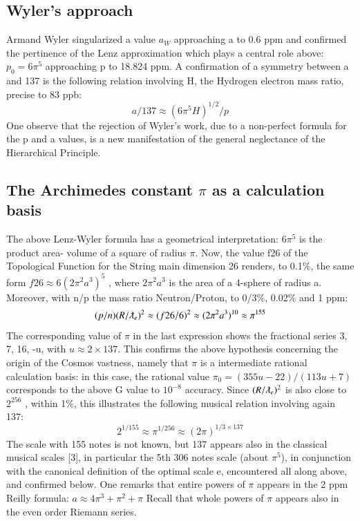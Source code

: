 \documentclass[twoside,draft]{article}
\begin{document}
{\subsection {Wyler's approach}

Armand Wyler singularized a value $a_{W}$ approaching a to 0.6 ppm and confirmed the pertinence
of the Lenz approximation which plays a central role above: $p_{0} = 6\pi^{5}$ approaching p to 18.824 ppm.
A confirmation of a symmetry between a and 137 is the following relation involving H, the
Hydrogen electron mass ratio, precise to 83 ppb:
$$a/137 \approx (6\pi^{5} H)^{1/2} /p$$
One observe that the rejection of Wyler's work, due to a non-perfect formula for the p and a values, is a new
manifestation of the general neglectance of the Hierarchical Principle.

\subsection {The Archimedes constant $\pi$ as a calculation basis}

The above Lenz-Wyler formula has a geometrical interpretation: $6\pi^{5}$ is the product area-
volume of a square of radius $\pi$. Now, the value f{26} of the Topological Function for the String
main dimension 26 renders, to 0.1\%, the same form $f{26} \approx 6(2\pi^{2} a^{3} )^{5}$ , where $2\pi^{2}a^{3}$ is the area of a
4-sphere of radius a. Moreover, with n/p the mass ratio Neutron/Proton, to 0/3\%, 0.02\% and 1
ppm:
$$(p/n) (R/\lambdabar_{e})^{2} \approx (f{26}/6)^{2} \approx (2\pi^{2} a^{3})^{10} \approx \pi^{155}$$
The corresponding value of $\pi$ in the last expression shows the fractional series 3, 7, 16, -u, with $u \approx
2 \times 137$. This confirms the above hypothesis concerning the origin of the Cosmos vastness, namely
that $\pi$ is a intermediate rational calculation basis: in this case, the rational value $\pi_{0} = (355u-22)/
(113u+7)$ corresponds to the above G value to $10^{-8}$ accuracy.
Since $(R/\lambdabar_{e})^{2}$ is also close to $2^{256}$ , within 1\%, this illustrates the following musical relation
involving again 137:
$$2^{1/155} \approx \pi^{1/256} \approx (2\pi)^{1/3 \times 137}$$
The scale with 155 notes is not known, but 137 appears also in the classical musical scales [3], in
particular the 5th 306 notes scale (about $\pi^{5}$), in conjunction with the canonical definition of the optimal
scale e, encountered all along above, and confirmed below.
One remarks that entire powers of $\pi$ appears in the 2 ppm Reilly formula: $a \approx 4\pi^{3} + \pi^{2} + \pi$
Recall that whole powers of $\pi$ appears also in the even order Riemann series.

}
\end{document}
